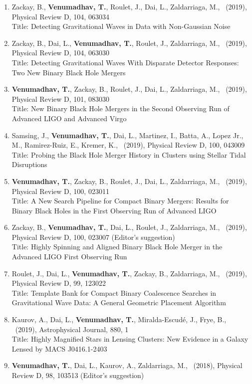 \documentclass{article}
\newcommand{\apj}{Astrophysical Journal}
\newcommand{\prd}{Physical Review D}
\newlength{\cvindent}
\newenvironment{cvblock}{\noindent\hspace*{\cvindent}\begin{minipage}{\dimexpr\textwidth-\cvindent\relax}}{\end{minipage}\par}
\begin{document}
\begin{cvblock}
\begin{enumerate}
	      \item Zackay, B., \textbf{Venumadhav, T.}, Roulet, J., Dai, L., Zaldarriaga, M., \ (2019), \prd, 104, 063034 \\
	      Title: Detecting Gravitational Waves in Data with Non-Gaussian Noise	      
	      \item Zackay, B., Dai, L., \textbf{Venumadhav, T.}, Roulet, J., Zaldarriaga, M., \ (2019), \prd, 104, 063030 \\
	      Title: Detecting Gravitational Waves With Disparate Detector Responses: Two New Binary Black Hole Mergers
	      \item \textbf{Venumadhav, T.}, Zackay, B., Roulet, J., Dai, L., Zaldarriaga, M., \ (2019), \prd, 101, 083030 \\
	      Title: New Binary Black Hole Mergers in the Second Observing Run of Advanced LIGO and Advanced Virgo
               \item Samsing, J., \textbf{Venumadhav, T.}, Dai, L., Martinez, I., Batta, A., Lopez Jr., M., Ramirez-Ruiz, E., Kremer, K., \ (2019), \prd, 100, 043009 \\
	       Title: Probing the Black Hole Merger History in Clusters using Stellar Tidal Disruptions
	      \item \textbf{Venumadhav, T.}, Zackay, B., Roulet, J., Dai, L., Zaldarriaga, M., \ (2019), \prd, 100, 023011 \\
	      Title: A New Search Pipeline for Compact Binary Mergers: Results for Binary Black Holes in the First Observing Run of Advanced LIGO
	      \item Zackay, B., \textbf{Venumadhav, T.}, Dai, L., Roulet, J., Zaldarriaga, M., \ (2019), \prd, 100, 023007 (Editor's suggestion) \\
	      Title: Highly Spinning and Aligned Binary Black Hole Merger in the Advanced LIGO First Observing Run	
	      \item Roulet, J., Dai, L., \textbf{Venumadhav, T.}, Zackay, B., Zaldarriaga, M., \ (2019), \prd, 99, 123022 \\
	      Title: Template Bank for Compact Binary Coalescence Searches in Gravitational Wave Data: A General Geometric Placement Algorithm
	      \item Kaurov, A., Dai, L., \textbf{Venumadhav, T.}, Miralda-Escud\'{e}, J., Frye, B., \ (2019), \apj, 880, 1 \\
	      Title: Highly Magnified Stars in Lensing Clusters: New Evidence in a Galaxy Lensed by MACS J0416.1-2403	      
	      \item \textbf{Venumadhav, T.}, Dai, L., Kaurov, A., Zaldarriaga, M., \ (2018), \prd, 98, 103513 (Editor's suggestion) \\

\end{enumerate}
\end{cvblock}
\end{document}
